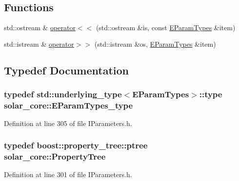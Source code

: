 \subsection*{Functions}
\begin{DoxyCompactItemize}
\item 
std\+::ostream \& \hyperlink{namespacesolar__core_aa8fea9dac434e9830aad9dea4f5ebf53}{operator$<$$<$} (std\+::ostream \&is, const \hyperlink{namespacesolar__core_aa1147341e5ef7a40d68d1bd68e149362}{E\+Param\+Types} \&item)
\item 
std\+::istream \& \hyperlink{namespacesolar__core_a82ed442d50159b64b565838515df1dba}{operator$>$$>$} (std\+::istream \&os, \hyperlink{namespacesolar__core_aa1147341e5ef7a40d68d1bd68e149362}{E\+Param\+Types} \&item)
\end{DoxyCompactItemize}


\subsection{Typedef Documentation}
\hypertarget{namespacesolar__core_a256e8e2dc052f522b522d3f90b294caf}{}
\subsubsection[{E\+Param\+Types\+\_\+type}]{\setlength{\rightskip}{0pt plus 5cm}typedef std\+::underlying\+\_\+type$<${\bf E\+Param\+Types}$>$\+::type {\bf solar\+\_\+core\+::\+E\+Param\+Types\+\_\+type}}\label{namespacesolar__core_a256e8e2dc052f522b522d3f90b294caf}


Definition at line 305 of file I\+Parameters.\+h.

\hypertarget{namespacesolar__core_adeda2737d6938c190eb774a5b2495045}{}
\subsubsection[{Property\+Tree}]{\setlength{\rightskip}{0pt plus 5cm}typedef boost\+::property\+\_\+tree\+::ptree {\bf solar\+\_\+core\+::\+Property\+Tree}}\label{namespacesolar__core_adeda2737d6938c190eb774a5b2495045}


Definition at line 301 of file I\+Parameters.\+h.

